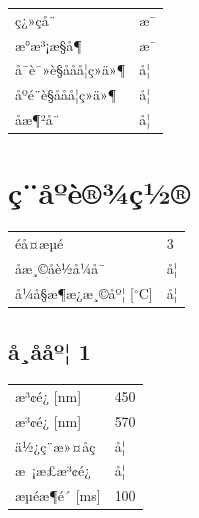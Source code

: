 \documentclass[UTF8,10pt,a4paper,fontset=fandol]{ctexart}
\newcommand{\fieldvalue}[1]{#1}
\begin{document}
\begin{tabular}{@{}ll@{}}
ç¿»ç­å¨ &
\fieldvalue{æ¯}\\
æ°æ³¡æ§å¶ &
\fieldvalue{æ¯}\\
å¯è¯»è§ååå­¦ç»ä»¶ &
\fieldvalue{å¦}\\
åºé¨è§ååå­¦ç»ä»¶ &
\fieldvalue{å¦}\\
åæ¶²å¨ &
\fieldvalue{å¦}
\end{tabular}

\section{ç¨åºè®¾ç½®}

\begin{tabular}{@{}ll@{}}
éå¤æµé &
\fieldvalue{3}\\
åæ¸©åè½å¼å¯ &
\fieldvalue{å¦}\\
å¼å§æ¶æ¿æ¸©åº¦ [$^\circ$C] &
\fieldvalue{å¦}
\end{tabular}

\subsection{å¸ååº¦ 1}

\begin{tabular}{@{}ll@{}}
æ³¢é¿ [nm] &
\fieldvalue{450}\\
æ³¢é¿ [nm] &
\fieldvalue{570}\\
ä½¿ç¨æ»¤åç &
\fieldvalue{å¦}\\
æ ¡æ­£æ³¢é¿ &
\fieldvalue{å¦}\\
æµéæ¶é´ [ms] &
\fieldvalue{100}
\end{tabular}

\end{document}
